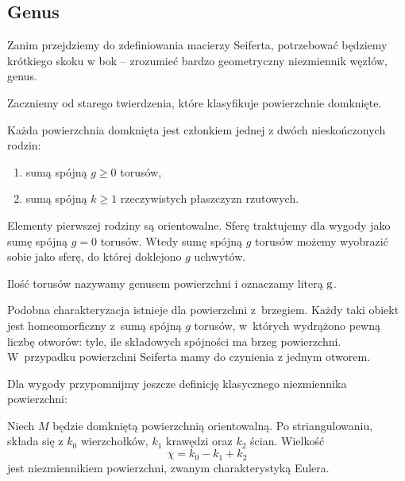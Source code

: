 \subsection{Genus}
%
\label{sec:genus}%
Zanim przejdziemy do zdefiniowania macierzy Seiferta, potrzebować będziemy krótkiego skoku w bok -- zrozumieć bardzo geometryczny niezmiennik węzłów, genus.

Zaczniemy od starego twierdzenia, które klasyfikuje powierzchnie domknięte.

\begin{proposition}
    Każda powierzchnia domknięta jest członkiem jednej z dwóch nieskończonych rodzin:
    \begin{enumerate}[leftmargin=*]
        \itemsep0em
        \item sumą spójną $g \ge 0$ torusów,
        \item sumą spójną $k \ge 1$ rzeczywistych płaszczyzn rzutowych.
    \end{enumerate}
\end{proposition}

Elementy pierwszej rodziny są orientowalne.
Sferę traktujemy dla wygody jako sumę spójną $g = 0$ torusów.
Wtedy sumę spójną $g$ torusów możemy wyobrazić sobie jako sferę, do której doklejono $g$ uchwytów.

\begin{definition}
    Ilość torusów nazywamy genusem powierzchni i oznaczamy literą $\operatorname{g}$.
\end{definition}

Podobna charakteryzacja istnieje dla powierzchni z~brzegiem.
Każdy taki obiekt jest homeomorficzny z~sumą spójną $g$ torusów, w~których wydrążono pewną liczbę otworów: tyle, ile składowych spójności ma brzeg powierzchni.
W~przypadku powierzchni Seiferta mamy do czynienia z jednym otworem.

Dla wygody przypomnijmy jeszcze definicję klasycznego niezmiennika powierzchni:

\begin{definition}
%
    Niech $M$ będzie domkniętą powierzchnią orientowalną.
    Po striangulowaniu, składa się z $k_0$ wierzchołków, $k_1$ krawędzi oraz $k_2$ ścian.
    Wielkość
    \begin{equation}
        \chi = k_0 - k_1 + k_2
    \end{equation}
    jest niezmiennikiem powierzchni, zwanym charakterystyką Eulera.
\end{definition}

